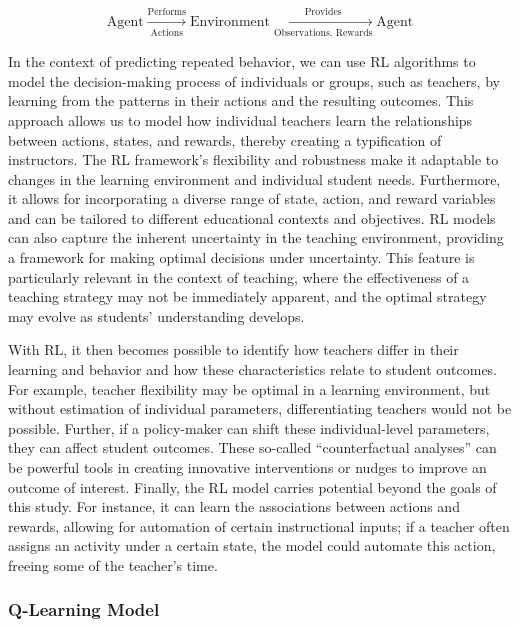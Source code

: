 \documentclass[
  number,
  preprint,
  3p,
  onecolumn]{elsarticle}
\begin{document}
\[
\text{Agent} \xrightarrow[\text{Actions}]{\text{Performs}} \text{Environment} \xrightarrow[\text{Observations, Rewards}]{\text{Provides}} \text{Agent}
\]

In the context of predicting repeated behavior, we can use RL algorithms
to model the decision-making process of individuals or groups, such as
teachers, by learning from the patterns in their actions and the
resulting outcomes. This approach allows us to model how individual
teachers learn the relationships between actions, states, and rewards,
thereby creating a typification of instructors. The RL framework's
flexibility and robustness make it adaptable to changes in the learning
environment and individual student needs. Furthermore, it allows for
incorporating a diverse range of state, action, and reward variables and
can be tailored to different educational contexts and objectives. RL
models can also capture the inherent uncertainty in the teaching
environment, providing a framework for making optimal decisions under
uncertainty. This feature is particularly relevant in the context of
teaching, where the effectiveness of a teaching strategy may not be
immediately apparent, and the optimal strategy may evolve as students'
understanding develops.

With RL, it then becomes possible to identify how teachers differ in
their learning and behavior and how these characteristics relate to
student outcomes. For example, teacher flexibility may be optimal in a
learning environment, but without estimation of individual parameters,
differentiating teachers would not be possible. Further, if a
policy-maker can shift these individual-level parameters, they can
affect student outcomes. These so-called ``counterfactual analyses'' can
be powerful tools in creating innovative interventions or nudges to
improve an outcome of interest. Finally, the RL model carries potential
beyond the goals of this study. For instance, it can learn the
associations between actions and rewards, allowing for automation of
certain instructional inputs; if a teacher often assigns an activity
under a certain state, the model could automate this action, freeing
some of the teacher's time.

\hypertarget{q-learning-model}{%
\subsubsection{Q-Learning Model}\label{q-learning-model}}
\end{document}
